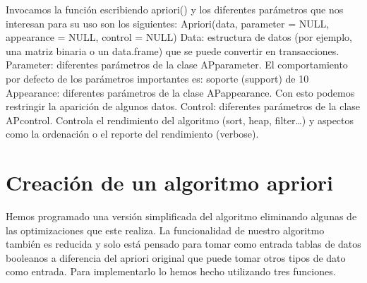 \documentclass [a4paper] {article}
\begin{document}
\vspace{5mm}

Invocamos la función escribiendo apriori() y los diferentes parámetros que nos interesan para su uso son los siguientes:
Apriori(data, parameter = NULL, appearance = NULL, control = NULL)
Data: estructura de datos (por ejemplo, una matriz binaria o un data.frame) que se puede convertir en transacciones.
Parameter: diferentes parámetros de la clase APparameter. El comportamiento por defecto de los parámetros importantes es: soporte (support) de 10%
Appearance: diferentes parámetros de la clase APappearance. Con esto podemos restringir la aparición de algunos datos.
Control: diferentes parámetros de la clase APcontrol. Controla el rendimiento del algoritmo (sort, heap, filter…) y aspectos como la ordenación o el reporte del rendimiento (verbose).

\newpage
\section{Creación de un algoritmo apriori}
Hemos programado una versión simplificada del algoritmo eliminando algunas de las optimizaciones que este realiza.
La funcionalidad de nuestro algoritmo también es reducida y solo está pensado para tomar como entrada tablas de datos booleanos 
a diferencia del apriori original que puede tomar otros tipos de dato como entrada.
Para implementarlo lo hemos hecho utilizando tres funciones.
\end{document}
